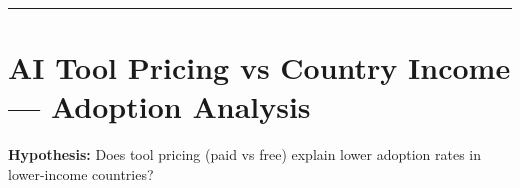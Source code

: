 \documentclass[10pt,a4paper]{article}
\begin{document}

\vspace{6pt}
\hrule
\vspace{6pt}

\newpage
\section*{AI Tool Pricing vs Country Income --- Adoption Analysis}

\textbf{Hypothesis:} Does tool pricing (paid vs free) explain lower adoption rates in
lower-income countries?
\end{document}
